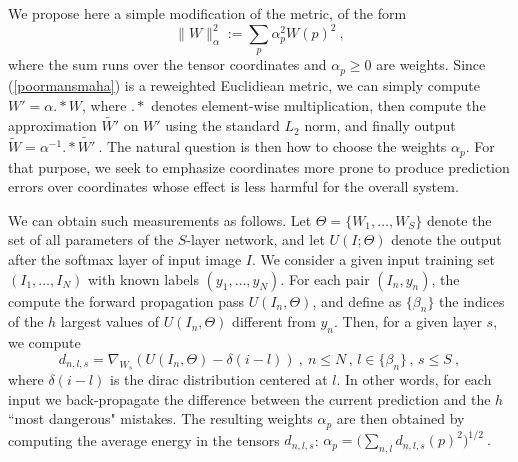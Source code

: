 
We propose here a simple modification of the metric, of the form 
\begin{equation}
\label{poormansmaha}
\| W \|_\alpha^2 := \sum_p \alpha_p^2 W(p)^2 ~,
\end{equation}
where the sum runs over the tensor coordinates and $\alpha_p \geq 0$ are weights.
Since (\ref{poormansmaha}) is a reweighted Euclidiean metric, we 
can simply compute $W' = \alpha .* W$, where $.*$ denotes element-wise multiplication, 
then compute the approximation $\widetilde{W'}$ on $W'$ using the standard $L_2$ norm, 
and finally output $\widetilde{W} = \alpha^{-1} .* \widetilde{W'}~.$
The natural question is then how to choose the weights $\alpha_p$. For that purpose, 
we seek to emphasize coordinates more prone to produce prediction errors over 
coordinates whose effect is less harmful for the overall system. 

We can obtain such measurements as follows. Let $\Theta=\{W_1,\dots,W_S\}$ denote
the set of all parameters of the $S$-layer network, and let $U(I; \Theta)$ denote the output 
after the softmax layer of input image $I$.
We consider  a given input training set $(I_1,\dots,I_N)$ 
with known labels $(y_1,\dots,y_N)$. For each pair $(I_n, y_n)$, 
the compute the forward propagation pass $U(I_n, \Theta)$, and 
define as $\{\beta_n\}$ the indices of the $h$ largest values of  $U(I_n, \Theta)$ 
different from $y_n$.
Then, for a given layer $s$, we compute
\begin{equation}
\label{approxi}
d_{n,l,s} = \nabla_{W_s} \left( U(I_n, \Theta) - \delta(i - l)\right)~,~n\leq N\,,\, l \in \{\beta_n\}\,,\, s\leq S~,
\end{equation}
where $\delta(i-l)$ is the dirac distribution centered at $l$.
In other words, for each input we back-propagate the difference between the current prediction and the 
$h$ ``most dangerous" mistakes. 
The resulting weights $\alpha_p$ are then obtained by computing the average energy in the tensors $d_{n,l,s}$:
$\alpha_p = \Big( \sum_{n,l} d_{n,l,s}(p)^2 \Big)^{1/2}~.$

